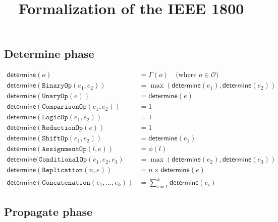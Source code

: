 \documentclass{article}
\title{Formalization of the IEEE 1800}
\date{}
\author{}
\begin{document}
\maketitle

\subsection*{Determine phase}

\begin{align*}
  \mathsf{determine}(o)
   & = \Gamma(o) \quad \text{(where $o \in \mathcal{O}$)}     \\
  \mathsf{determine}(\texttt{BinaryOp}(e_1, e_2))
   & = \max(\mathsf{determine}(e_1), \mathsf{determine}(e_2)) \\
  \mathsf{determine}(\texttt{UnaryOp}(e))
   & = \mathsf{determine}(e)                                  \\
  \mathsf{determine}(\texttt{ComparisonOp}(e_1, e_2))
   & = 1                                                      \\
  \mathsf{determine}(\texttt{LogicOp}(e_1, e_2))
   & = 1                                                      \\
  \mathsf{determine}(\texttt{ReductionOp}(e))
   & = 1                                                      \\
  \mathsf{determine}(\texttt{ShiftOp}(e_1, e_2))
   & = \mathsf{determine}(e_1)                                \\
  \mathsf{determine}(\texttt{AssignmentOp}(l, e))
   & = \phi(l)                                                \\
  \mathsf{determine}(\texttt{ConditionalOp}(e_1, e_2, e_3)
   & = \max(\mathsf{determine}(e_2), \mathsf{determine}(e_3)) \\
  \mathsf{determine}(\texttt{Replication}(n, e))
   & = n \times \mathsf{determine}(e)                         \\
  \mathsf{determine}(\texttt{Concatenation}(e_1, \ldots, e_k))
   & = \sum_{i=1}^{k} \mathsf{determine}(e_i)
\end{align*}


\subsection*{Propagate phase}
\end{document}
